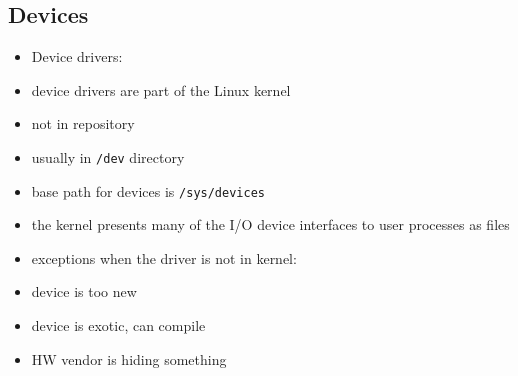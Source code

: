 \documentclass[twocolumn]{IEEEtran} %
\begin{document}
\subsection{Devices}
\begin{itemize}
    \item Device drivers:
    \bi
        \item device drivers are part of the Linux kernel
        \bi
            \item not in repository
            \item usually in \verb|/dev| directory
            \item base path for devices is \verb|/sys/devices|
        \ei
        \item the kernel presents many of the I/O device interfaces to user processes as files
        \item exceptions when the driver is not in kernel:
        \bi
            \item device is too new
            \item device is exotic, can compile
            \item HW vendor is hiding something
        \ei
    \ei


\end{itemize}
\end{document}
